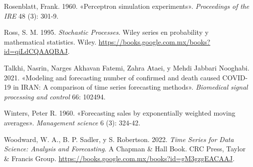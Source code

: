 \documentclass[
  letterpaper,
  DIV=11,
  numbers=noendperiod]{scrreport}
\newlength{\cslhangindent}
\newenvironment{CSLReferences}[2] %
 {\begin{list}{}{%
  \setlength{\itemindent}{0pt}
  \setlength{\leftmargin}{0pt}
  \setlength{\parsep}{0pt}
  \ifodd #1
   \setlength{\leftmargin}{\cslhangindent}
   \setlength{\itemindent}{-1\cslhangindent}
  \fi
  \setlength{\itemsep}{#2\baselineskip}}}
 {\end{list}}
\theoremstyle{plain}
\theoremstyle{definition}
\theoremstyle{definition}
\theoremstyle{plain}
\theoremstyle{remark}
\begin{document}
\begin{CSLReferences}{1}{0}
Rosenblatt, Frank. 1960. {«Perceptron simulation experiments»}.
\emph{Proceedings of the IRE} 48 (3): 301-9.

Ross, S. M. 1995. \emph{Stochastic Processes}. Wiley series en
probability y mathematical statistics. Wiley.
\url{https://books.google.com.mx/books?id=qiLdCQAAQBAJ}.

Talkhi, Nasrin, Narges Akhavan Fatemi, Zahra Ataei, y Mehdi Jabbari
Nooghabi. 2021. {«Modeling and forecasting number of confirmed and death
caused COVID-19 in IRAN: A comparison of time series forecasting
methods»}. \emph{Biomedical signal processing and control} 66: 102494.

Winters, Peter R. 1960. {«Forecasting sales by exponentially weighted
moving averages»}. \emph{Management science} 6 (3): 324-42.

Woodward, W. A., B. P. Sadler, y S. Robertson. 2022. \emph{Time Series
for Data Science: Analysis and Forecasting}. A Chapman \& Hall Book. CRC
Press, Taylor \& Francis Group.
\url{https://books.google.com.mx/books?id=gM3gzgEACAAJ}.

\end{CSLReferences}
\end{document}
